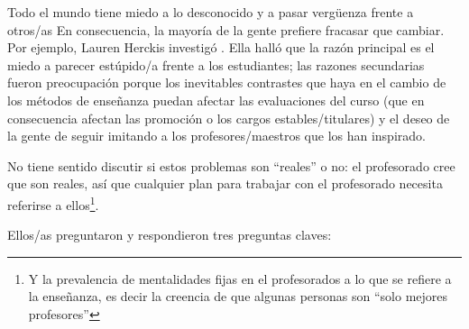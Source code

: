 Todo el mundo tiene miedo a lo desconocido y a pasar vergüenza frente a otros/as
En consecuencia,
la mayoría de la gente prefiere fracasar que cambiar.
Por ejemplo,
Lauren Herckis investigó 
.
Ella halló que la razón principal es el miedo a parecer estúpido/a frente a los estudiantes;
las razones secundarias fueron
preocupación porque los inevitables contrastes que haya en el cambio de los métodos de enseñanza puedan afectar las evaluaciones del curso
(que en consecuencia afectan las promoción o los cargos estables/titulares)
y el deseo de la gente de seguir imitando a los profesores/maestros que los han inspirado.

No tiene sentido discutir si estos problemas son “reales” o no:
el profesorado cree que son reales,
así que cualquier plan para trabajar con el profesorado necesita referirse a ellos\footnote{
Y la prevalencia de mentalidades fijas en el profesorados a lo que se refiere a la enseñanza, es decir la creencia de que algunas personas son “solo mejores profesores” }.

Ellos/as preguntaron y respondieron tres preguntas claves:

